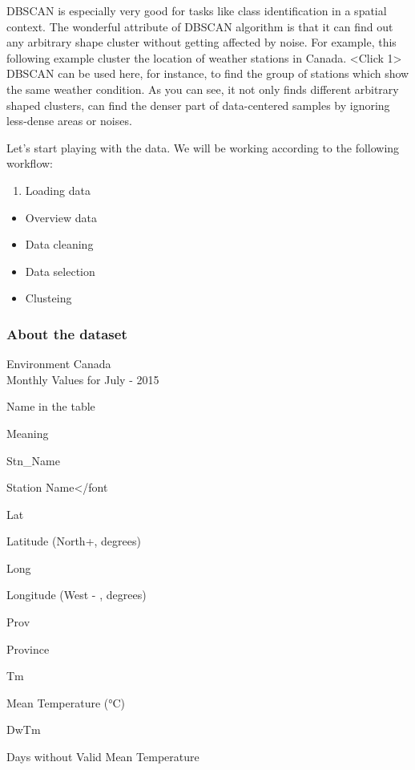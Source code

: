 \documentclass[11pt]{article}
\providecommand{\tightlist}{%
      \setlength{\itemsep}{0pt}\setlength{\parskip}{0pt}}
\begin{document}
DBSCAN is especially very good for tasks like class identification in a
spatial context. The wonderful attribute of DBSCAN algorithm is that it
can find out any arbitrary shape cluster without getting affected by
noise. For example, this following example cluster the location of
weather stations in Canada. \textless Click 1\textgreater{} DBSCAN can
be used here, for instance, to find the group of stations which show the
same weather condition. As you can see, it not only finds different
arbitrary shaped clusters, can find the denser part of data-centered
samples by ignoring less-dense areas or noises.

Let's start playing with the data. We will be working according to the
following workflow:

\begin{enumerate}
\def\labelenumi{\arabic{enumi}.}
\tightlist
\item
  Loading data
\end{enumerate}

\begin{itemize}
\tightlist
\item
  Overview data
\item
  Data cleaning
\item
  Data selection
\item
  Clusteing
\end{itemize}

    \hypertarget{about-the-dataset}{%
\subsubsection{About the dataset}\label{about-the-dataset}}

Environment Canada\\
Monthly Values for July - 2015

Name in the table

Meaning

Stn\_Name

Station Name\textless/font

Lat

Latitude (North+, degrees)

Long

Longitude (West - , degrees)

Prov

Province

Tm

Mean Temperature (°C)

DwTm

Days without Valid Mean Temperature
\end{document}
